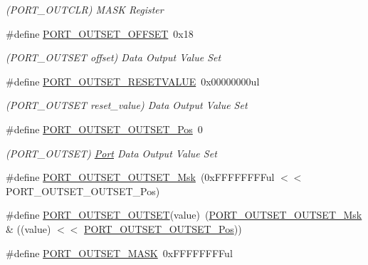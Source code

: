 \begin{DoxyCompactItemize}
\begin{DoxyCompactList}\small\item\em (P\+O\+R\+T\+\_\+\+O\+U\+T\+C\+LR) M\+A\+SK Register \end{DoxyCompactList}\item 
\#define \mbox{\hyperlink{group___s_a_m_d21___p_o_r_t_ga2836c334826cf0fa63d6be8319f3eaa4}{P\+O\+R\+T\+\_\+\+O\+U\+T\+S\+E\+T\+\_\+\+O\+F\+F\+S\+ET}}~0x18
\begin{DoxyCompactList}\small\item\em (P\+O\+R\+T\+\_\+\+O\+U\+T\+S\+ET offset) Data Output Value Set \end{DoxyCompactList}\item 
\#define \mbox{\hyperlink{group___s_a_m_d21___p_o_r_t_ga703a3d3fb11897242e5edbdda11d3e01}{P\+O\+R\+T\+\_\+\+O\+U\+T\+S\+E\+T\+\_\+\+R\+E\+S\+E\+T\+V\+A\+L\+UE}}~0x00000000ul
\begin{DoxyCompactList}\small\item\em (P\+O\+R\+T\+\_\+\+O\+U\+T\+S\+ET reset\+\_\+value) Data Output Value Set \end{DoxyCompactList}\item 
\#define \mbox{\hyperlink{group___s_a_m_d21___p_o_r_t_gab15b9d26363709ae77584b0f8140ba42}{P\+O\+R\+T\+\_\+\+O\+U\+T\+S\+E\+T\+\_\+\+O\+U\+T\+S\+E\+T\+\_\+\+Pos}}~0
\begin{DoxyCompactList}\small\item\em (P\+O\+R\+T\+\_\+\+O\+U\+T\+S\+ET) \mbox{\hyperlink{struct_port}{Port}} Data Output Value Set \end{DoxyCompactList}\item 
\#define \mbox{\hyperlink{group___s_a_m_d21___p_o_r_t_ga090fd7414eb6fa473a4036f84f853dca}{P\+O\+R\+T\+\_\+\+O\+U\+T\+S\+E\+T\+\_\+\+O\+U\+T\+S\+E\+T\+\_\+\+Msk}}~(0x\+F\+F\+F\+F\+F\+F\+F\+Ful $<$$<$ P\+O\+R\+T\+\_\+\+O\+U\+T\+S\+E\+T\+\_\+\+O\+U\+T\+S\+E\+T\+\_\+\+Pos)
\item 
\#define \mbox{\hyperlink{group___s_a_m_d21___p_o_r_t_gad55b0fcb6f9df9920cdd1e23cb809b31}{P\+O\+R\+T\+\_\+\+O\+U\+T\+S\+E\+T\+\_\+\+O\+U\+T\+S\+ET}}(value)~(\mbox{\hyperlink{group___s_a_m_d21___p_o_r_t_ga090fd7414eb6fa473a4036f84f853dca}{P\+O\+R\+T\+\_\+\+O\+U\+T\+S\+E\+T\+\_\+\+O\+U\+T\+S\+E\+T\+\_\+\+Msk}} \& ((value) $<$$<$ \mbox{\hyperlink{group___s_a_m_d21___p_o_r_t_gab15b9d26363709ae77584b0f8140ba42}{P\+O\+R\+T\+\_\+\+O\+U\+T\+S\+E\+T\+\_\+\+O\+U\+T\+S\+E\+T\+\_\+\+Pos}}))
\item 
\#define \mbox{\hyperlink{group___s_a_m_d21___p_o_r_t_gac9419f71279d6ec7826fd713af780d7c}{P\+O\+R\+T\+\_\+\+O\+U\+T\+S\+E\+T\+\_\+\+M\+A\+SK}}~0x\+F\+F\+F\+F\+F\+F\+F\+Ful

\end{DoxyCompactItemize}
